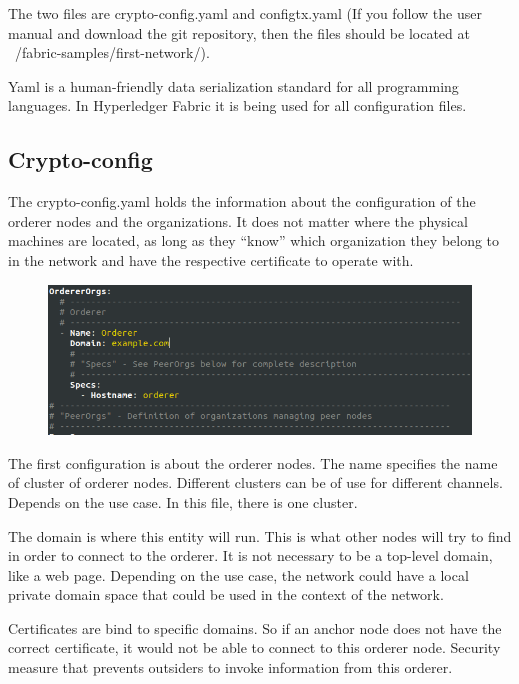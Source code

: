 \documentclass[a4paper,11pt]{report}
\begin{document}
	The two files are crypto-config.yaml and configtx.yaml (If you follow the user manual and download the git repository, then the files should be located at ~/fabric-samples/first-network/). 
	
	Yaml is a human-friendly data serialization standard for all programming languages. In Hyperledger Fabric it is being used for all configuration files. 

\subsection{Crypto-config}

The crypto-config.yaml holds the information about the configuration of the orderer nodes and the organizations. It does not matter where the physical machines are located, as long as they “know” which organization they belong to in the network and have the respective certificate to operate with.

\begin{figure}[h]
\centering
  \includegraphics[width = 16cm]{cryptoconfig1.png}
  \caption{ }
  \label{dockerEnvironment}
\end{figure}

The first configuration is about the orderer nodes. The name specifies the name of cluster of orderer nodes. Different clusters can be of use for different channels. Depends on the use case. In this file, there is one cluster.

The domain is where this entity will run. This is what other nodes will try to find in order to connect to the orderer. It is not necessary to be a top-level domain, like a web page. Depending on the use case, the network could have a local private domain space that could be used in the context of the network.

Certificates are bind to specific domains. So if an anchor node does not have the correct certificate, it would not be able to connect to this orderer node. Security measure that prevents outsiders to invoke information from this orderer.
\end{document}
